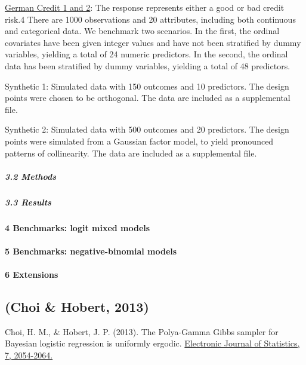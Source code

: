 \documentclass[
]{article}
\begin{document}
\href{http://archive.ics.uci.edu/ml/datasets/Statlog+(German+Credit+Data)}{German
Credit 1 and 2}: The response represents either a good or bad credit
risk.4 There are 1000 observations and 20 attributes, including both
continuous and categorical data. We benchmark two scenarios. In the
first, the ordinal covariates have been given integer values and have
not been stratified by dummy variables, yielding a total of 24 numeric
predictors. In the second, the ordinal data has been stratified by dummy
variables, yielding a total of 48 predictors.

Synthetic 1: Simulated data with 150 outcomes and 10 predictors. The
design points were chosen to be orthogonal. The data are included as a
supplemental file.

Synthetic 2: Simulated data with 500 outcomes and 20 predictors. The
design points were simulated from a Gaussian factor model, to yield
pronounced patterns of collinearity. The data are included as a
supplemental file.

\hypertarget{methods}{%
\subparagraph{3.2 Methods}\label{methods}}

\hypertarget{results}{%
\subparagraph{3.3 Results}\label{results}}

\hypertarget{benchmarks-logit-mixed-models}{%
\paragraph{4 Benchmarks: logit mixed
models}\label{benchmarks-logit-mixed-models}}

\hypertarget{benchmarks-negative-binomial-models}{%
\paragraph{5 Benchmarks: negative-binomial
models}\label{benchmarks-negative-binomial-models}}

\hypertarget{extensions}{%
\paragraph{6 Extensions}\label{extensions}}

\hypertarget{choi-hobert-2013}{%
\subsection{(Choi \& Hobert, 2013)}\label{choi-hobert-2013}}

Choi, H. M., \& Hobert, J. P. (2013). The Polya-Gamma Gibbs sampler for
Bayesian logistic regression is uniformly ergodic.
\href{https://projecteuclid.org/euclid.ejs/1377005819}{Electronic
Journal of Statistics, 7, 2054-2064.}
\end{document}
